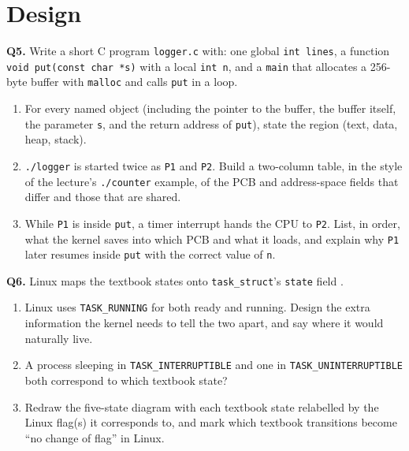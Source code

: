 \documentclass[11pt]{article}
\begin{document}
\section{Design}

\textbf{Q5.} Write a short C program \texttt{logger.c} with: one global \texttt{int lines}, a function \texttt{void put(const char *s)} with a local \texttt{int n}, and a \texttt{main} that allocates a 256-byte buffer with \texttt{malloc} and calls \texttt{put} in a loop.
\begin{enumerate}
  \item[(a)] For every named object (including the pointer to the buffer, the buffer itself, the parameter \texttt{s}, and the return address of \texttt{put}), state the region (text, data, heap, stack).
  \item[(b)] \texttt{./logger} is started twice as \texttt{P1} and \texttt{P2}. Build a two-column table, in the style of the lecture's \texttt{./counter} example, of the PCB and address-space fields that differ and those that are shared.
  \item[(c)] While \texttt{P1} is inside \texttt{put}, a timer interrupt hands the CPU to \texttt{P2}. List, in order, what the kernel saves into which PCB and what it loads, and explain why \texttt{P1} later resumes inside \texttt{put} with the correct value of \texttt{n}.
\end{enumerate}

\textbf{Q6.} Linux maps the textbook states onto \texttt{task\_struct}'s \texttt{state} field \cite{BovetCesati_understanding_linux_kernel}.
\begin{enumerate}
  \item[(a)] Linux uses \texttt{TASK\_RUNNING} for both ready and running. Design the extra information the kernel needs to tell the two apart, and say where it would naturally live.
  \item[(b)] A process sleeping in \texttt{TASK\_INTERRUPTIBLE} and one in \texttt{TASK\_UNINTERRUPTIBLE} both correspond to which textbook state?
  \item[(c)] Redraw the five-state diagram with each textbook state relabelled by the Linux flag(s) it corresponds to, and mark which textbook transitions become ``no change of flag'' in Linux.
\end{enumerate}



\end{document}
